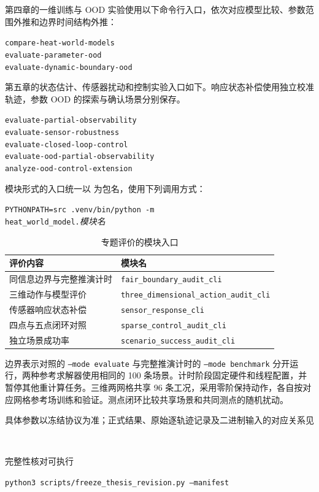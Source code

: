 第四章的一维训练与 OOD 实验使用以下命令行入口，依次对应模型比较、参数范围外推和边界时间结构外推：
\begin{center}
  \small\texttt{compare-heat-world-models}\\
  \texttt{evaluate-parameter-ood}\\
  \texttt{evaluate-dynamic-boundary-ood}
\end{center}
第五章的状态估计、传感器扰动和控制实验入口如下。响应状态补偿使用独立校准轨迹，参数 OOD 的探索与确认场景分别保存。
\begin{center}
  \small\texttt{evaluate-partial-observability}\\
  \texttt{evaluate-sensor-robustness}\\
  \texttt{evaluate-closed-loop-control}\\
  \texttt{evaluate-ood-partial-observability}\\
  \texttt{analyze-ood-control-extension}
\end{center}
模块形式的入口统一以  为包名，使用下列调用方式：
\begin{center}
  \small\texttt{PYTHONPATH=src .venv/bin/python -m}\\
  \texttt{heat\_world\_model.}\textit{模块名}
\end{center}
\begin{table}[H]
  \centering
  \small
  \caption{专题评价的模块入口}
  \begin{tabular}{ll}
    \toprule
    评价内容 & 模块名 \\
    \midrule
    同信息边界与完整推演计时 & \texttt{fair\_boundary\_audit\_cli} \\
    三维动作与模型评价 & \texttt{three\_dimensional\_action\_audit\_cli} \\
    传感器响应状态补偿 & \texttt{sensor\_response\_cli} \\
    四点与五点闭环对照 & \texttt{sparse\_control\_audit\_cli} \\
    独立场景成功率 & \texttt{scenario\_success\_audit\_cli} \\
    \bottomrule
  \end{tabular}
\end{table}
边界表示对照的 \texttt{--mode evaluate} 与完整推演计时的 \texttt{--mode benchmark} 分开运行，两种参考求解器使用相同的 100 条场景。计时阶段固定硬件和线程配置，并暂停其他重计算任务。三维两网格共享 96 条工况，采用零阶保持动作，各自按对应网格参考场训练和验证。测点闭环比较共享场景和共同测点的随机扰动。

具体参数以冻结协议为准；正式结果、原始逐轨迹记录及二进制输入的对应关系见
\begin{center}
  \\
\end{center}
完整性核对可执行
\begin{center}
  \small\texttt{python3 scripts/freeze\_thesis\_revision.py --manifest}\\
\end{center}

